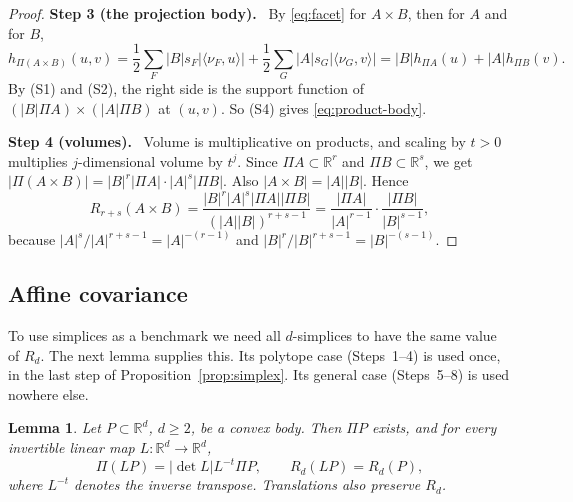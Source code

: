 \documentclass[11pt]{article}
\newtheorem{lemma}[theorem]{Lemma}
\newcommand{\R}{\mathbb R}
\newcommand{\step}[1]{\par\smallskip\noindent\textbf{#1}\ }
\begin{document}
\begin{proof}
\step{Step 3 (the projection body).} By \eqref{eq:facet} for \(A\times B\),
then for \(A\) and for \(B\),
\[
 h_{\Pi(A\times B)}(u,v)
 =\frac12\sum_F|B|s_F|\langle\nu_F,u\rangle|
  +\frac12\sum_G|A|s_G|\langle\nu_G,v\rangle|
 =|B|h_{\Pi A}(u)+|A|h_{\Pi B}(v).
\]
By (S1) and (S2), the right side is the support function of
\((|B|\Pi A)\times(|A|\Pi B)\) at \((u,v)\). So (S4) gives
\eqref{eq:product-body}.

\step{Step 4 (volumes).} Volume is multiplicative on products, and scaling
by \(t>0\) multiplies \(j\)-dimensional volume by \(t^j\). Since
\(\Pi A\subset\R^r\) and \(\Pi B\subset\R^s\), we get
\(|\Pi(A\times B)|=|B|^r|\Pi A|\cdot|A|^s|\Pi B|\). Also
\(|A\times B|=|A||B|\). Hence
\[
 R_{r+s}(A\times B)
 =\frac{|B|^r|A|^s|\Pi A||\Pi B|}{(|A||B|)^{r+s-1}}
 =\frac{|\Pi A|}{|A|^{r-1}}\cdot\frac{|\Pi B|}{|B|^{s-1}},
\]
because \(|A|^{s}/|A|^{r+s-1}=|A|^{-(r-1)}\) and
\(|B|^{r}/|B|^{r+s-1}=|B|^{-(s-1)}\).
\end{proof}

\subsection{Affine covariance}

To use simplices as a benchmark we need all \(d\)-simplices to have the
same value of \(R_d\). The next lemma supplies this. Its polytope case
(Steps~1--4) is used once, in the last step of
Proposition~\ref{prop:simplex}. Its general case (Steps~5--8) is used
nowhere else.

\begin{lemma}\label{lem:affine}
Let \(P\subset\R^d\), \(d\ge2\), be a convex body. Then \(\Pi P\) exists,
and for every invertible linear map \(L\colon\R^d\to\R^d\),
\[
 \Pi(LP)=|\det L|L^{-t}\Pi P,\qquad R_d(LP)=R_d(P),
\]
where \(L^{-t}\) denotes the inverse transpose. Translations also
preserve \(R_d\).
\end{lemma}
\end{document}

